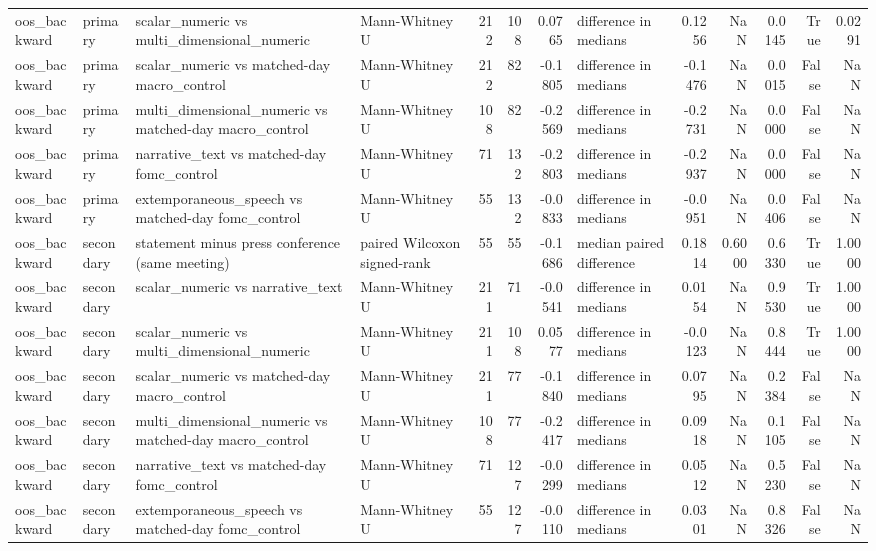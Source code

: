 \begin{tabular}{llllrrrlrrrrr}
oos_backward & primary & scalar_numeric vs multi_dimensional_numeric & Mann-Whitney U & 212 & 108 & 0.0765 & difference in medians & 0.1256 & NaN & 0.0145 & True & 0.0291 \\
oos_backward & primary & scalar_numeric vs matched-day macro_control & Mann-Whitney U & 212 & 82 & -0.1805 & difference in medians & -0.1476 & NaN & 0.0015 & False & NaN \\
oos_backward & primary & multi_dimensional_numeric vs matched-day macro_control & Mann-Whitney U & 108 & 82 & -0.2569 & difference in medians & -0.2731 & NaN & 0.0000 & False & NaN \\
oos_backward & primary & narrative_text vs matched-day fomc_control & Mann-Whitney U & 71 & 132 & -0.2803 & difference in medians & -0.2937 & NaN & 0.0000 & False & NaN \\
oos_backward & primary & extemporaneous_speech vs matched-day fomc_control & Mann-Whitney U & 55 & 132 & -0.0833 & difference in medians & -0.0951 & NaN & 0.0406 & False & NaN \\
oos_backward & secondary & statement minus press conference (same meeting) & paired Wilcoxon signed-rank & 55 & 55 & -0.1686 & median paired difference & 0.1814 & 0.6000 & 0.6330 & True & 1.0000 \\
oos_backward & secondary & scalar_numeric vs narrative_text & Mann-Whitney U & 211 & 71 & -0.0541 & difference in medians & 0.0154 & NaN & 0.9530 & True & 1.0000 \\
oos_backward & secondary & scalar_numeric vs multi_dimensional_numeric & Mann-Whitney U & 211 & 108 & 0.0577 & difference in medians & -0.0123 & NaN & 0.8444 & True & 1.0000 \\
oos_backward & secondary & scalar_numeric vs matched-day macro_control & Mann-Whitney U & 211 & 77 & -0.1840 & difference in medians & 0.0795 & NaN & 0.2384 & False & NaN \\
oos_backward & secondary & multi_dimensional_numeric vs matched-day macro_control & Mann-Whitney U & 108 & 77 & -0.2417 & difference in medians & 0.0918 & NaN & 0.1105 & False & NaN \\
oos_backward & secondary & narrative_text vs matched-day fomc_control & Mann-Whitney U & 71 & 127 & -0.0299 & difference in medians & 0.0512 & NaN & 0.5230 & False & NaN \\
oos_backward & secondary & extemporaneous_speech vs matched-day fomc_control & Mann-Whitney U & 55 & 127 & -0.0110 & difference in medians & 0.0301 & NaN & 0.8326 & False & NaN \\

\end{tabular}
